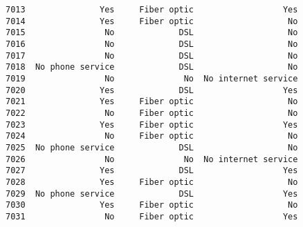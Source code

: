 \documentclass[11pt]{article}
\begin{document}
\begin{tcolorbox}[breakable, boxrule=.5pt, size=fbox, pad at break*=1mm, opacityfill=0]
\begin{Verbatim}[commandchars=\\\{\}]
7013               Yes     Fiber optic                  Yes
7014               Yes     Fiber optic                   No
7015                No             DSL                   No
7016                No             DSL                   No
7017                No             DSL                   No
7018  No phone service             DSL                   No
7019                No              No  No internet service
7020               Yes             DSL                  Yes
7021               Yes     Fiber optic                   No
7022                No     Fiber optic                   No
7023               Yes     Fiber optic                  Yes
7024                No     Fiber optic                   No
7025  No phone service             DSL                   No
7026                No              No  No internet service
7027               Yes             DSL                  Yes
7028               Yes     Fiber optic                   No
7029  No phone service             DSL                  Yes
7030               Yes     Fiber optic                   No
7031                No     Fiber optic                  Yes


\end{Verbatim}
\end{tcolorbox}
\end{document}
